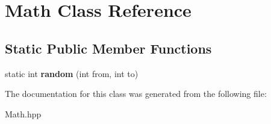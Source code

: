 \hypertarget{class_math}{}\section{Math Class Reference}
\label{class_math}
\subsection*{Static Public Member Functions}
\begin{DoxyCompactItemize}
\item 
\mbox{\label{class_math_a8c99abf983c23215d0d1bb26e3b50023}} 
static int {\bfseries random} (int from, int to)
\end{DoxyCompactItemize}


The documentation for this class was generated from the following file\+:\begin{DoxyCompactItemize}
\item 
Math.\+hpp\end{DoxyCompactItemize}
